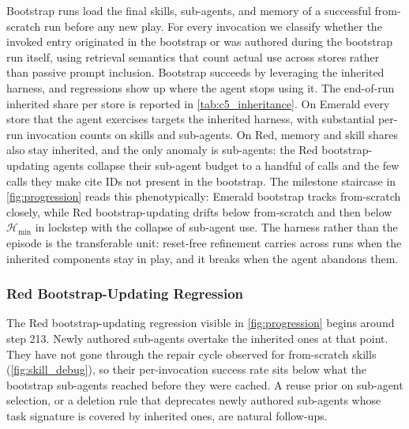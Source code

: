 Bootstrap runs load the final skills, sub-agents, and memory of a successful from-scratch run before any new play. For every invocation we classify whether the invoked entry originated in the bootstrap or was authored during the bootstrap run itself, using retrieval semantics that count actual use across stores rather than passive prompt inclusion. Bootstrap succeeds by leveraging the inherited harness, and regressions show up where the agent stops using it. The end-of-run inherited share per store is reported in \cref{tab:c5_inheritance}. On Emerald every store that the agent exercises targets the inherited harness, with substantial per-run invocation counts on skills and sub-agents. On Red, memory and skill shares also stay inherited, and the only anomaly is sub-agents: the Red bootstrap-updating agents collapse their sub-agent budget to a handful of calls and the few calls they make cite IDs not present in the bootstrap. The milestone staircase in \cref{fig:progression} reads this phenotypically: Emerald bootstrap tracks from-scratch closely, while Red bootstrap-updating drifts below from-scratch and then below $\mathcal{H}_{\min}$ in lockstep with the collapse of sub-agent use. The harness rather than the episode is the transferable unit: reset-free refinement carries across runs when the inherited components stay in play, and it breaks when the agent abandons them.



\subsubsection{Red Bootstrap-Updating Regression}\label{app:red_regression}

The Red bootstrap-updating regression visible in \cref{fig:progression} begins around step 213. Newly authored sub-agents overtake the inherited ones at that point. They have not gone through the repair cycle observed for from-scratch skills (\cref{fig:skill_debug}), so their per-invocation success rate sits below what the bootstrap sub-agents reached before they were cached. A reuse prior on sub-agent selection, or a deletion rule that deprecates newly authored sub-agents whose task signature is covered by inherited ones, are natural follow-ups.
